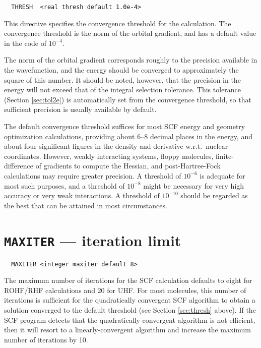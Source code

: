\begin{verbatim}
  THRESH  <real thresh default 1.0e-4>
\end{verbatim}

This directive specifies the convergence threshold for the
calculation.  The convergence threshold is the norm of the orbital
gradient, and has a default value in the code of $10^{-4}$.

The norm of the orbital gradient corresponds roughly to the precision
available in the wavefunction, and the energy should be converged to
approximately the square of this number.  It should be noted, however,
that the precision in the energy will not exceed that of the integral
selection tolerance.  This tolerance (Section \ref{sec:tol2e}) is
automatically set from the convergence threshold, so that sufficient
precision is usually available by default.

The default convergence threshold suffices for most SCF energy and
geometry optimization calculations, providing about 6--8 decimal
places in the energy, and about four significant figures in the
density and derivative w.r.t.\ nuclear coordinates.  However, weakly
interacting systems, floppy molecules, finite-difference of gradients
to compute the Hessian, and post-Hartree-Fock calculations may require
greater precision.  A threshold of $10^{-6}$ is adequate for most such
purposes, and a threshold of $10^{-8}$ might be necessary for very
high accuracy or very weak interactions.  A threshold of $10^{-10}$
should be regarded as the best that can be attained in most
circumstances.

\section{{\tt MAXITER} --- iteration limit}
\label{sec:max}

\begin{verbatim}
  MAXITER <integer maxiter default 8>
\end{verbatim}

\sloppy

The maximum number of iterations for the SCF calculation defaults to
eight for ROHF/RHF calculations and 20 for UHF.  For most molecules,
this number of iterations is sufficient for the quadratically
convergent SCF algorithm to obtain a solution converged to the
default threshold (see Section \ref{sec:thresh} above).  If the SCF
program detects that the quad\-ratically-con\-ver\-gent algorithm is not
efficient, then it will resort to a lin\-early-con\-ver\-gent algorithm and
increase the maximum number of iterations by 10.


